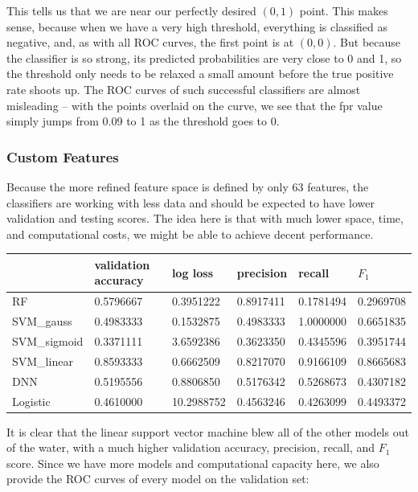 \documentclass{article} %
\begin{document}
This tells us that we are near our perfectly desired $(0, 1)$ point.  This makes sense, because when we have a very high threshold, everything is classified as negative, and, as with all ROC curves, the first point is at $(0, 0)$.  But because the classifier is so strong, its predicted probabilities are very close to 0 and 1, so the threshold only needs to be relaxed a small amount before the true positive rate shoots up.  The ROC curves of such successful classifiers are almost misleading -- with the points overlaid on the curve, we see that the fpr value simply jumps from 0.09 to 1 as the threshold goes to 0.
\subsubsection{Custom Features}
Because the more refined feature space is defined by only 63 features, the classifiers are working with less data and should be expected to have lower validation and testing scores.  The idea here is that with much lower space, time, and computational costs, we might be able to achieve decent performance.
\begin{table}[H]
\centering
\begin{tabular}{|l|l|l|l|l|l|}
\hline
             & validation accuracy & log loss   & precision & recall    & $F_1$     \\ \hline
RF           & 0.5796667           & 0.3951222  & 0.8917411 & 0.1781494 & 0.2969708 \\ \hline
SVM\_gauss   & 0.4983333           & 0.1532875  & 0.4983333 & 1.0000000 & 0.6651835 \\ \hline
SVM\_sigmoid & 0.3371111           & 3.6592386  & 0.3623350 & 0.4345596 & 0.3951744 \\ \hline
SVM\_linear  & 0.8593333           & 0.6662509  & 0.8217070 & 0.9166109 & 0.8665683 \\ \hline
DNN          & 0.5195556           & 0.8806850  & 0.5176342 & 0.5268673 & 0.4307182 \\ \hline
Logistic     & 0.4610000           & 10.2988752 & 0.4563246 & 0.4263099 & 0.4493372 \\ \hline
\end{tabular}
\end{table}
It is clear that the linear support vector machine blew all of the other models out of the water, with a much higher validation accuracy, precision, recall, and $F_1$ score.  Since we have more models and computational capacity here, we also provide the ROC curves of every model on the validation set:
\end{document}
